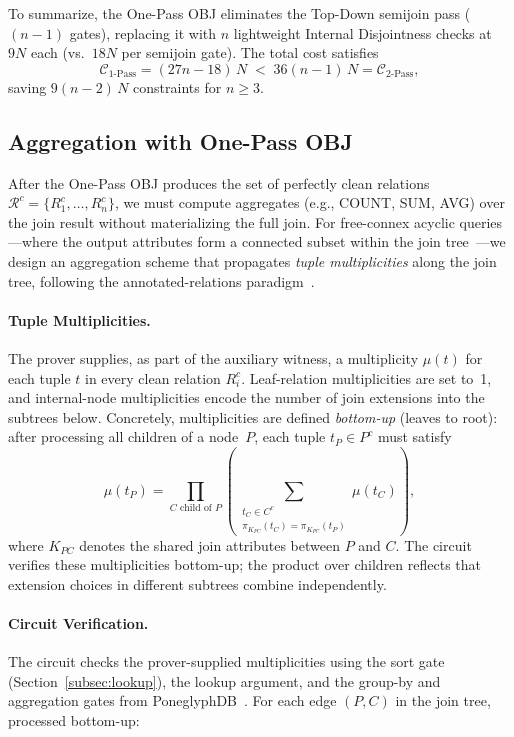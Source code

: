 \documentclass[sigconf]{acmart}
\renewcommand{\emph}[1]{\textit{#1}}
\begin{document}
\noindent To summarize, the One-Pass OBJ eliminates the Top-Down semijoin pass ($(n{-}1)$ gates), replacing it with $n$ lightweight Internal Disjointness checks at $9N$ each (vs.\ $18N$ per semijoin gate). The total cost satisfies
\[
    \mathcal{C}_{\text{1-Pass}} = (27n{-}18)\,N
    \;<\;
    36(n{-}1)\,N = \mathcal{C}_{\text{2-Pass}},
\]
saving $9(n{-}2)\,N$ constraints for $n \geq 3$.




\subsection{Aggregation with One-Pass OBJ}
\label{subsec:aggregation}

After the One-Pass OBJ produces the set of perfectly clean relations $\mathcal{R}^c = \{R_1^c, \dots, R_n^c\}$, we must compute aggregates (e.g., COUNT, SUM, AVG) over the join result without materializing the full join. For free-connex acyclic queries---where the output attributes form a connected subset within the join tree~\cite{bagan2007acyclic}---we design an aggregation scheme that propagates \emph{tuple multiplicities} along the join tree, following the annotated-relations paradigm~\cite{abokhamis2016faq}.

\paragraph{Tuple Multiplicities.}
The prover supplies, as part of the auxiliary witness, a multiplicity $\mu(t)$ for each tuple $t$ in every clean relation $R_i^c$. Leaf-relation multiplicities are set to~1, and internal-node multiplicities encode the number of join extensions into the subtrees below. Concretely, multiplicities are defined \emph{bottom-up} (leaves to root): after processing all children of a node~$P$, each tuple $t_P \in P^c$ must satisfy
\[
\mu(t_P) = \prod_{C \text{ child of } P} \left( \sum_{\substack{t_C \in C^c \\ \pi_{K_{PC}}(t_C) = \pi_{K_{PC}}(t_P)}} \mu(t_C) \right),
\]
where $K_{PC}$ denotes the shared join attributes between $P$ and $C$.
The circuit verifies these multiplicities bottom-up; the product over children reflects that extension choices in different subtrees combine independently.

\vspace{-0.1in}
\paragraph{Circuit Verification.}
The circuit checks the prover-supplied multiplicities using the sort gate (Section~\ref{subsec:lookup}), the lookup argument, and the group-by and aggregation gates from PoneglyphDB~\cite{gu2025poneglyphdb}. For each edge $(P, C)$ in the join tree, processed bottom-up:
\end{document}
